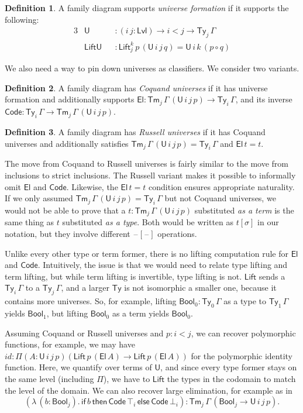 \documentclass[a4paper,UKenglish,cleveref, autoref, thm-restate]{lipics-v2021}
\theoremstyle{remark}
\theoremstyle{definition}
\newtheorem{mydefinition}{Definition}
\newcommand{\Ty}{\mathsf{Ty}}
\newcommand{\Tm}{\mathsf{Tm}}
\newcommand{\U}{\mathsf{U}}
\newcommand{\El}{\mathsf{El}}
\newcommand{\blank}{\mathord{\hspace{1pt}\text{--}\hspace{1pt}}}
\newcommand{\mi}[1]{\mathit{#1}}
\newcommand{\Bool}{\mathsf{Bool}}
\newcommand{\Lift}{\mathsf{Lift}}
\newcommand{\Lvl}{\mathsf{Lvl}}
\renewcommand{\U}{\mathsf{U}}
\newcommand{\Code}{\mathsf{Code}}
\begin{document}
\begin{mydefinition} A family diagram supports \emph{universe formation} if it supports the following:
\begin{alignat*}{3}
  & \U             &&: (i\,j : \Lvl) \to i < j \to \Ty_j\,\Gamma\\
  & \mathsf{LiftU} &&: \Lift_{j}^{k}\,p\,(\U\,i\,j\,q) = \U\,i\,k\,(p \circ q)
\end{alignat*}
\end{mydefinition}
We also need a way to pin down universes as classifiers. We consider two variants.
\begin{mydefinition}
A family diagram has \emph{Coquand universes} if it has universe formation and
additionally supports $\El : \Tm_j\,\Gamma\,(\U\,i\,j\,p) \to \Ty_i\,\Gamma$, and
its inverse $\Code : \Ty_i\,\Gamma \to \Tm_j\,\Gamma\,(\U\,i\,j\,p)$.
\end{mydefinition}
\begin{mydefinition}
A family diagram has \emph{Russell universes} if it has Coquand universes and
additionally satisfies $\Tm_j\,\Gamma\,(\U\,i\,j\,p) = \Ty_i\,\Gamma$ and
$\El\,t = t$.
\end{mydefinition}

The move from Coquand to Russell universes is fairly similar to the move from
inclusions to strict inclusions. The Russell variant makes it possible to
informally omit $\El$ and $\Code$. Likewise, the $\El\,t = t$ condition ensures
appropriate naturality. If we only assumed $\Tm_j\,\Gamma\,(\U\,i\,j\,p) =
\Ty_i\,\Gamma$ but not Coquand universes, we would not be able to prove that a
$t : \Tm_j\,\Gamma\,(\U\,i\,j\,p)$ substituted \emph{as a term} is the same
thing as $t$ substituted \emph{as a type}. Both would be written as $t[\sigma]$
in our notation, but they involve different $\blank[\blank]$ operations.

Unlike every other type or term former, there is no lifting computation rule for
$\El$ and $\Code$. Intuitively, the issue is that we would need to relate type
lifting and term lifting, but while term lifting is invertible, type lifting is
not. $\Lift$ sends a $\Ty_i\,\Gamma$ to a $\Ty_j\,\Gamma$, and a larger $\Ty$ is
not isomorphic a smaller one, because it contains more universes. So, for
example, lifting $\Bool_0 : \Ty_0\,\Gamma$ as a type to $\Ty_1\,\Gamma$ yields
$\Bool_1$, but lifting $\Bool_0$ as a term yields $\Bool_0$.

Assuming Coquand or Russell universes and $p : i < j$, we can recover
polymorphic functions, for example, we may have $\mi{id} : \Pi(A : \U\,i\,j\,p)
(\Lift\,p\,(\El\,A) \to \Lift\,p\,(\El\,A))$ for the polymorphic identity
function. Here, we quantify over terms of $\U$, and since every type former
stays on the same level (including $\Pi$), we have to $\Lift$ the types in the
codomain to match the level of the domain. We can also recover large
elimination, for example as in
\[
(\lambda\,(b : \Bool_j).\,\mathsf{if}\,b\,\mathsf{then}\,\Code\,\top_i\,\mathsf{else}\,\Code\,\bot_i)
: \Tm_j\,\Gamma\,(\Bool_j \to \U\,i\,j\,p).
\]
\end{document}
